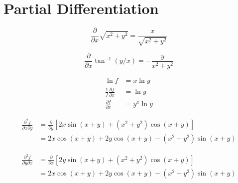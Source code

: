 \documentclass[12pt]{article}
\begin{document}



\pagebreak
\section*{Partial Differentiation}





\begin{equation}
    \frac{\partial}{\partial x} \sqrt{x^{2} + y^{2}} = \frac{x}{\sqrt{x^{2} + y^{2}}}
\end{equation}


\begin{equation}
    \frac{\partial}{\partial x} \tan^{-1}(y/x) = -\frac{y}{x^{2} + y^{2}}
\end{equation}


\begin{equation}
    \begin{split}
        \ln{f} &= x\ln{y} \\
        \frac{1}{f} \frac{\partial f}{\partial x} &= \ln{y} \\
        \frac{\partial f}{\partial x} &= y^{x} \ln{y}
    \end{split}
\end{equation}



\begin{equation}
    \begin{split}
        \frac{\partial^{2} f}{\partial x \partial y} &= \frac{\partial}{\partial y} \left[ 2x \sin{(x + y)} + (x^{2} + y^{2}) \cos{(x + y)} \right] \\
        &= 2x \cos{(x + y)} + 2y \cos{(x + y)} - (x^{2} + y^{2}) \sin{(x + y)}
    \end{split}
\end{equation}

\begin{equation}
    \begin{split}
        \frac{\partial^{2} f}{\partial y \partial x} &= \frac{\partial}{\partial x} \left[ 2y \sin{(x + y)} + (x^{2} + y^{2}) \cos{(x + y)} \right] \\
        &= 2x \cos{(x + y)} + 2y \cos{(x + y)} - (x^{2} + y^{2}) \sin{(x + y)}
    \end{split}
\end{equation}
\end{document}
